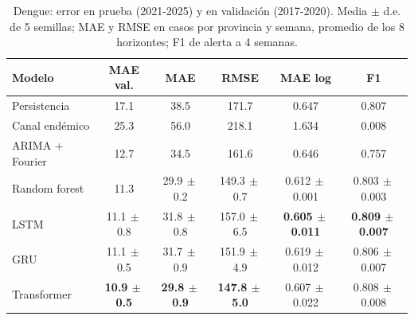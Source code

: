 \begin{table}[t]
\centering\caption{Dengue: error en prueba (2021-2025) y en validación (2017-2020). Media $\pm$ d.e. de 5 semillas; MAE y RMSE en casos por provincia y semana, promedio de los 8 horizontes; F1 de alerta a 4 semanas.}\label{tab:dengue}
\setlength{\tabcolsep}{2.3pt}\footnotesize
\begin{tabular}{lccccc}
\toprule
Modelo & MAE val. & MAE & RMSE & MAE log & F1 \\
\midrule
Persistencia & 17.1 & 38.5 & 171.7 & 0.647 & 0.807 \\
Canal endémico & 25.3 & 56.0 & 218.1 & 1.634 & 0.008 \\
ARIMA + Fourier & 12.7 & 34.5 & 161.6 & 0.646 & 0.757 \\
Random forest & 11.3 & 29.9{\tiny$\,\pm$0.2} & 149.3{\tiny$\,\pm$0.7} & 0.612{\tiny$\,\pm$0.001} & 0.803{\tiny$\,\pm$0.003} \\
\midrule
LSTM & 11.1{\tiny$\,\pm$0.8} & 31.8{\tiny$\,\pm$0.8} & 157.0{\tiny$\,\pm$6.5} & \textbf{0.605{\tiny$\,\pm$0.011}} & \textbf{0.809{\tiny$\,\pm$0.007}} \\
GRU & 11.1{\tiny$\,\pm$0.5} & 31.7{\tiny$\,\pm$0.9} & 151.9{\tiny$\,\pm$4.9} & 0.619{\tiny$\,\pm$0.012} & 0.806{\tiny$\,\pm$0.007} \\
Transformer & \textbf{10.9{\tiny$\,\pm$0.5}} & \textbf{29.8{\tiny$\,\pm$0.9}} & \textbf{147.8{\tiny$\,\pm$5.0}} & 0.607{\tiny$\,\pm$0.022} & 0.808{\tiny$\,\pm$0.008} \\
\bottomrule
\end{tabular}
\end{table}
